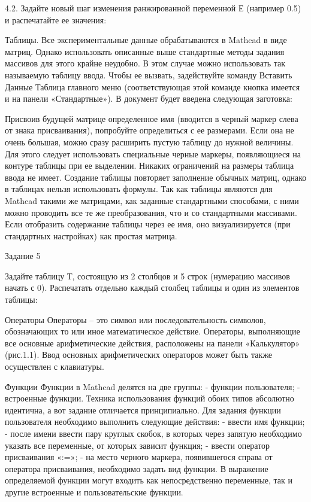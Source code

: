 4.2. Задайте новый шаг изменения ранжированной переменной Е (например 0.5) и распечатайте ее значения:



Таблицы. Все экспериментальные данные обрабатываются в Mathcad в виде матриц. Однако использовать описанные выше стандартные методы задания массивов для этого крайне неудобно. В этом случае можно использовать так называемую таблицу ввода. Чтобы ее вызвать, задействуйте команду Вставить  Данные  Таблица главного меню (соответствующая этой команде кнопка имеется и на панели «Стандартные»). В документ будет введена следующая заготовка:



Присвоив будущей матрице определенное имя (вводится в черный маркер слева от знака присваивания), попробуйте определиться с ее размерами. Если она не очень большая, можно сразу расширить пустую таблицу до нужной величины. Для этого следует использовать специальные черные маркеры, появляющиеся на контуре таблицы при ее выделении. Никаких ограничений на размеры таблица ввода не имеет. Создание таблицы повторяет заполнение обычных матриц, однако в таблицах нельзя использовать формулы.
Так как таблицы являются для Mathcad такими же матрицами, как заданные стандартными способами, с ними можно проводить все те же преобразования, что и со стандартными массивами. Если отобразить содержание таблицы через ее имя, оно визуализируется (при стандартных настройках) как простая матрица.

Задание 5

Задайте таблицу Т, состоящую из 2 столбцов и 5 строк (нумерацию массивов начать с 0). Распечатать отдельно каждый столбец таблицы и один из элементов таблицы:



Операторы
Операторы – это символ или последовательность символов, обозначающих то или иное математическое действие. Операторы, выполняющие все основные арифметические действия, расположены на панели «Калькулятор» (рис.1.1). Ввод основных арифметических операторов может быть также осуществлен с клавиатуры.

Функции
Функции в Mathcad делятся на две группы:
- функции пользователя;
- встроенные функции.
Техника использования функций обоих типов абсолютно идентична, а вот задание отличается принципиально. Для задания функции пользователя необходимо выполнить следующие действия:
- ввести имя функции;
- после имени ввести пару круглых скобок, в которых через запятую необходимо указать все переменные, от которых зависит функция;
- ввести оператор присваивания «:=»;
- на место черного маркера, появившегося справа от оператора присваивания, необходимо задать вид функции.
В выражение определяемой функции могут входить как непосредственно переменные, так и другие встроенные и пользовательские функции. 

